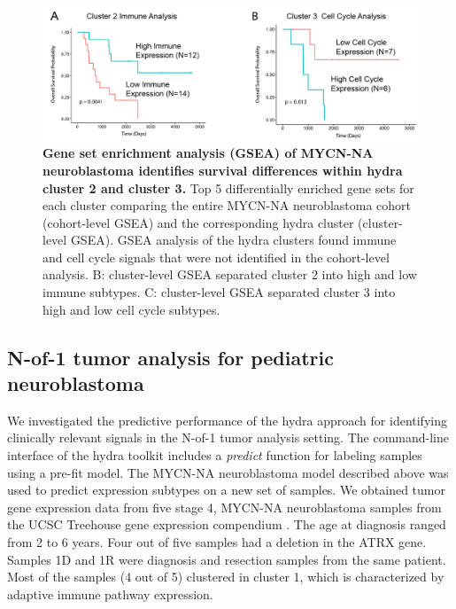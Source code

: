 \documentclass[10pt,letterpaper]{article}
\begin{document}
\begin{figure}[!h]
	\includegraphics[width=\textwidth]{img/PNG/SubCluster-Survival-V1-2x}
	\caption{{\bf Gene set enrichment analysis (GSEA) of MYCN-NA neuroblastoma identifies survival differences within hydra cluster 2 and cluster 3.}
		Top 5 differentially enriched gene sets for each cluster comparing the entire MYCN-NA neuroblastoma cohort (cohort-level GSEA) and the corresponding hydra cluster (cluster-level GSEA). GSEA analysis of the hydra clusters found immune and cell cycle signals that were not identified in the cohort-level analysis. B: cluster-level GSEA separated cluster 2 into high and low immune subtypes. C: cluster-level GSEA separated cluster 3 into high and low cell cycle subtypes.}
	\label{subcluster}
\end{figure}

\subsection*{N-of-1 tumor analysis for pediatric neuroblastoma}
We investigated the predictive performance of the hydra approach for identifying clinically relevant signals in the N-of-1 tumor analysis setting. The command-line interface of the hydra toolkit includes a \textit{predict} function for labeling samples using a pre-fit model. The MYCN-NA neuroblastoma model described above was used to predict expression subtypes on a new set of samples. We obtained tumor gene expression data from five stage 4, MYCN-NA neuroblastoma samples from the UCSC Treehouse gene expression compendium \cite{newtonTumorMapExploringMolecular2017, vaskeComparativeTumorRNA2019}. The age at diagnosis ranged from 2 to 6 years. Four out of five samples had a deletion in the ATRX gene. Samples 1D and 1R were diagnosis and resection samples from the same patient. Most of the samples (4 out of 5) clustered in cluster 1, which is characterized by adaptive immune pathway expression.
\end{document}
